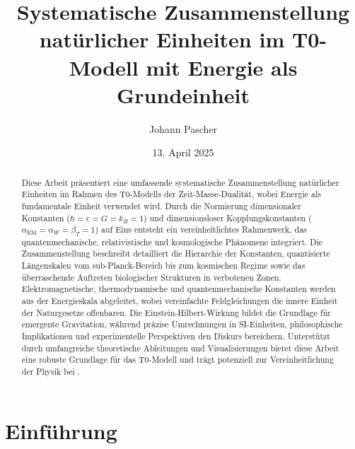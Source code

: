 \documentclass[12pt,a4paper]{article}
\begin{document}
	
	\title{Systematische Zusammenstellung natürlicher Einheiten im T0-Modell mit Energie als Grundeinheit}
	\author{Johann Pascher}
	\date{13. April 2025}
	
	\maketitle
	
	\begin{abstract}
		Diese Arbeit präsentiert eine umfassende systematische Zusammenstellung natürlicher Einheiten im Rahmen des T0-Modells der Zeit-Masse-Dualität, wobei Energie als fundamentale Einheit verwendet wird. Durch die Normierung dimensionaler Konstanten (\(\hbar = c = G = k_B = 1\)) und dimensionsloser Kopplungskonstanten (\(\alpha_{\text{EM}} = \alpha_W = \beta_T = 1\)) auf Eins entsteht ein vereinheitlichtes Rahmenwerk, das quantenmechanische, relativistische und kosmologische Phänomene integriert. Die Zusammenstellung beschreibt detailliert die Hierarchie der Konstanten, quantisierte Längenskalen vom sub-Planck-Bereich bis zum kosmischen Regime sowie das überraschende Auftreten biologischer Strukturen in verbotenen Zonen. Elektromagnetische, thermodynamische und quantenmechanische Konstanten werden aus der Energieskala abgeleitet, wobei vereinfachte Feldgleichungen die innere Einheit der Naturgesetze offenbaren. Die Einstein-Hilbert-Wirkung bildet die Grundlage für emergente Gravitation, während präzise Umrechnungen in SI-Einheiten, philosophische Implikationen und experimentelle Perspektiven den Diskurs bereichern. Unterstützt durch umfangreiche theoretische Ableitungen und Visualisierungen bietet diese Arbeit eine robuste Grundlage für das T0-Modell und trägt potenziell zur Vereinheitlichung der Physik bei \cite{pascher_alphabeta_2025}.
	\end{abstract}
	
	\tableofcontents
	\newpage
	
	\section{Einführung}
	\label{sec:introduction}
	
\end{document}
